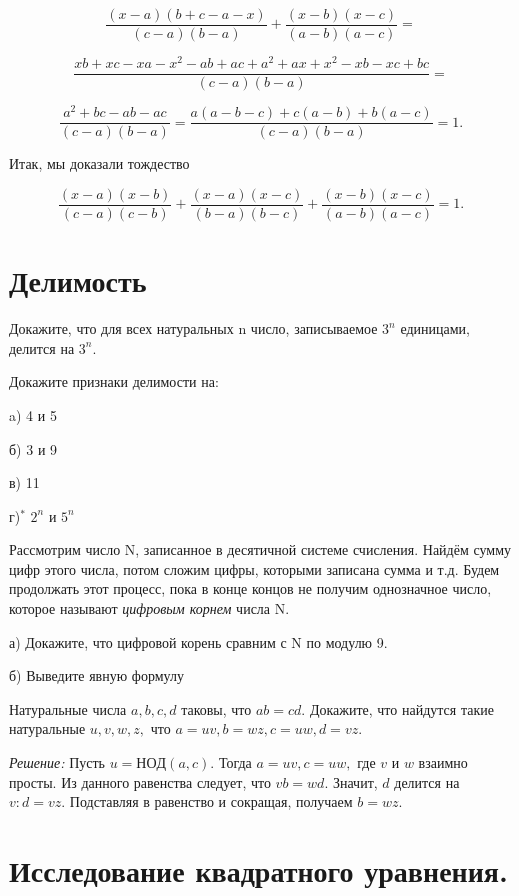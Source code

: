 \[
\frac{(x-a)(b+c-a-x)}{(c-a)(b-a)} + \frac{(x-b)(x-c)}{(a-b)(a-c)} =
\]

\[
\frac{xb + xc - xa - x^2 - ab + ac + a^2 + ax + x^2 - xb - xc + bc}{(c-a)(b-a)} =
\]

\[
\frac{a^2 + bc - ab - ac}{(c-a)(b-a)} = \frac{a(a-b-c) + c(a-b) + b(a-c)}{(c-a)(b-a)} = 1.
\]

Итак, мы доказали тождество

\[
\frac{(x-a)(x-b)}{(c-a)(c-b)} + \frac{(x-a)(x-c)}{(b-a)(b-c)} + \frac{(x-b)(x-c)}{(a-b)(a-c)} = 1.
\]



\section{\Large \bf Делимость}


Докажите, что для всех натуральных n число, записываемое $3^n$ единицами, делится на $3^n$.

Докажите признаки делимости на: 

a) 4 и 5

б) 3 и 9

в) 11

г)$^*$ $2^n$ и $5^n$

Рассмотрим число N, записанное в десятичной системе счисления. Найдём сумму цифр этого числа, потом сложим цифры, которыми записана сумма и т.д. Будем продолжать этот процесс, пока в конце концов не получим однозначное число, которое называют \textit{цифровым корнем} числа N.

а) Докажите, что цифровой корень сравним с N по модулю 9.

б) Выведите явную формулу

Натуральные числа $a, b, c, d$ таковы, что  $ab = cd.$  Докажите, что найдутся такие натуральные $u, v, w, z,$ что $a = uv,  b = wz,  c = uw,  d = vz.$

\textit{Решение:} Пусть $u = НОД(a, c).$  Тогда  $a = uv,  c = uw,$  где $v$ и $w$ взаимно просты. Из данного равенства следует, что  $vb = wd.$  Значит, $d$ делится на $v:  d = vz$. Подставляя в равенство и сокращая, получаем  $b = wz.$

\newpage

\hspace{3mm}

\section{Исследование квадратного уравнения.}

